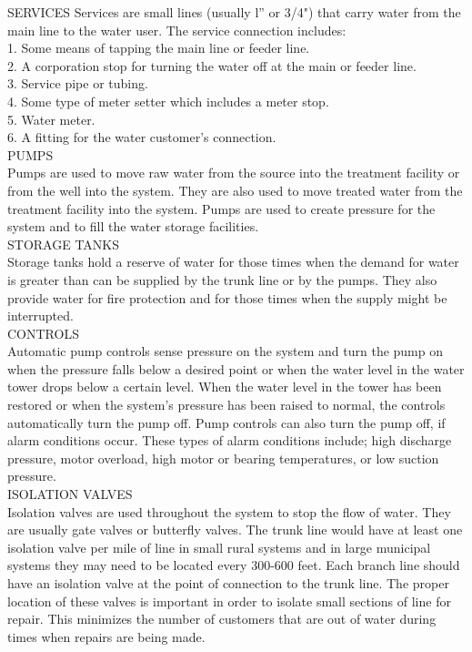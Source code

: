 \documentclass{article}
\begin{document}
SERVICES
Services are small lines (usually l” or 3/4") that carry water from the main line to the water user. The service connection includes:\\
1. Some means of tapping the main line or feeder line.\\
2. A corporation stop for turning the water off at the main or feeder line.\\
3. Service pipe or tubing.\\
4. Some type of meter setter which includes a meter stop.\\
5. Water meter.\\
6. A fitting for the water customer’s connection.\\
PUMPS\\
Pumps are used to move raw water from the source into the treatment facility or from the well into the system. They are also used to move treated water from the treatment facility into the system. Pumps are used to create pressure for the system and to fill the water storage facilities.\\
STORAGE TANKS\\
Storage tanks hold a reserve of water for those times when the demand for water is greater than can be supplied by the trunk line or by the pumps. They also provide water for fire protection and for those times when the supply might be interrupted.\\
CONTROLS\\
Automatic pump controls sense pressure on the system and turn the pump on when the pressure falls below a desired point or when the water level in the water tower drops below a certain level. When the water level in the tower has been restored or when the system’s pressure has been raised to normal, the controls automatically turn the pump off. Pump controls can also turn the pump off, if alarm conditions occur. These types of alarm conditions include; high discharge pressure, motor overload, high motor or bearing temperatures, or low suction pressure.\\
ISOLATION VALVES\\Isolation valves are used throughout the system to stop the flow of water. They are usually gate valves or butterfly valves. The trunk line would have at least one isolation valve per mile of line in small rural systems and in large municipal systems they may need to be located every 300-600 feet. Each branch line should have an isolation valve at the point of connection to the trunk line. The proper location of these valves is important in order to isolate small sections of line for repair. This minimizes the number of customers that are out of water during times when repairs are being made.\\
\end{document}
